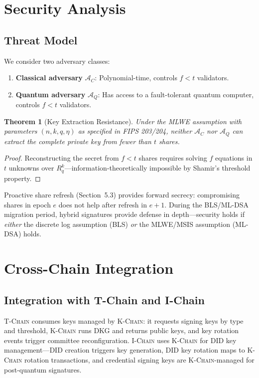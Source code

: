 \documentclass[11pt,letterpaper]{article}
\newtheorem{theorem}{Theorem}
\theoremstyle{definition}
\theoremstyle{remark}
\newcommand{\KChain}{\textsc{K-Chain}}
\newcommand{\TChain}{\textsc{T-Chain}}
\newcommand{\IChain}{\textsc{I-Chain}}
\begin{document}
\section{Security Analysis}

\subsection{Threat Model}

We consider two adversary classes:

\begin{enumerate}
\item \textbf{Classical adversary} $\mathcal{A}_C$: Polynomial-time, controls $f < t$ validators.
\item \textbf{Quantum adversary} $\mathcal{A}_Q$: Has access to a fault-tolerant quantum computer, controls $f < t$ validators.
\end{enumerate}

\begin{theorem}[Key Extraction Resistance]
Under the MLWE assumption with parameters $(n, k, q, \eta)$ as specified in FIPS 203/204, neither $\mathcal{A}_C$ nor $\mathcal{A}_Q$ can extract the complete private key from fewer than $t$ shares.
\end{theorem}

\begin{proof}
Reconstructing the secret from $f < t$ shares requires solving $f$ equations in $t$ unknowns over $R_q^k$---information-theoretically impossible by Shamir's threshold property.
\end{proof}

Proactive share refresh (Section~5.3) provides forward secrecy: compromising shares in epoch $e$ does not help after refresh in $e+1$. During the BLS/ML-DSA migration period, hybrid signatures provide defense in depth---security holds if \emph{either} the discrete log assumption (BLS) \emph{or} the MLWE/MSIS assumption (ML-DSA) holds.

\section{Cross-Chain Integration}

\subsection{Integration with T-Chain and I-Chain}

\TChain{} \cite{zoo-threshold-signatures} consumes keys managed by \KChain{}: it requests signing keys by type and threshold, \KChain{} runs DKG and returns public keys, and key rotation events trigger committee reconfiguration. \IChain{} \cite{zoo-identity-chain} uses \KChain{} for DID key management---DID creation triggers key generation, DID key rotation maps to \KChain{} rotation transactions, and credential signing keys are \KChain{}-managed for post-quantum signatures.
\end{document}
